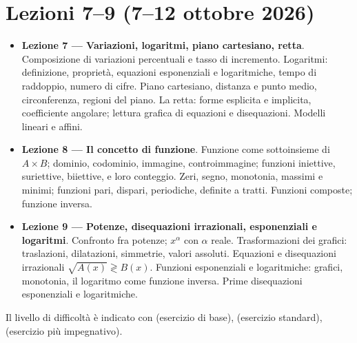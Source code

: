 \chapter{Lezioni 7--9 (7--12 ottobre 2026)}

\begin{vuoto}{}
\begin{itemize}
\item[\bul] \textbf{Lezione 7 --- Variazioni, logaritmi, piano cartesiano, retta}. Composizione di variazioni percentuali e tasso di incremento. Logaritmi: definizione, proprietà, equazioni esponenziali e logaritmiche, tempo di raddoppio, numero di cifre. Piano cartesiano, distanza e punto medio, circonferenza, regioni del piano. La retta: forme esplicita e implicita, coefficiente angolare; lettura grafica di equazioni e disequazioni. Modelli lineari e affini.
\item[\bul] \textbf{Lezione 8 --- Il concetto di funzione}. Funzione come sottoinsieme di $A\times B$; dominio, codominio, immagine, controimmagine; funzioni iniettive, suriettive, biiettive, e loro conteggio. Zeri, segno, monotonia, massimi e minimi; funzioni pari, dispari, periodiche, definite a tratti. Funzioni composte; funzione inversa.
\item[\bul] \textbf{Lezione 9 --- Potenze, disequazioni irrazionali, esponenziali e logaritmi}. Confronto fra potenze; $x^\alpha$ con $\alpha$ reale. Trasformazioni dei grafici: traslazioni, dilatazioni, simmetrie, valori assoluti. Equazioni e disequazioni irrazionali $\sqrt{A(x)}\gtrless B(x)$. Funzioni esponenziali e logaritmiche: grafici, monotonia, il logaritmo come funzione inversa. Prime disequazioni esponenziali e logaritmiche.
\end{itemize}
\end{vuoto}

Il livello di difficoltà è indicato con  (esercizio di base),  (esercizio standard),  (esercizio più impegnativo).

